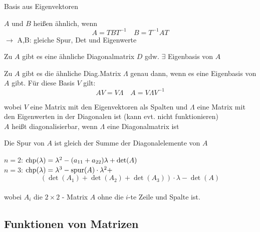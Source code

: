 \documentclass[a4paper,twocolumn]{article}
\begin{document}
	\begin{fdef}[Eigenbasis]
		Basis aus Eigenvektoren
	\end{fdef}

	\begin{feig}[A, B ähnlich]
		$A$ und $B$ heißen ähnlich, wenn 
			$$A = T B T^{-1}    \quad   B = T^{-1} A T$$
		$\rightarrow$ A,B: gleiche Spur, Det und Eigenwerte
	\end{feig}
	
		Zu $A$ gibt es eine ähnliche Diagonalmatrix $D$ gdw. $\exists$ Eigenbasis von $A$

	\begin{fsatz}
		Zu $A$ gibt es die ähnliche Diag.Matrix $\Lambda$ genau dann, wenn es eine Eigenbasis von $A$ gibt. Für diese Basis $V$ gilt:
		$$A V = V \Lambda \quad A = V \Lambda V^{-1}$$
		
		wobei $V$ eine Matrix mit den Eigenvektoren als Spalten und $\Lambda$ eine Matrix mit den Eigenwerten in der Diagonalen ist (kann evt. nicht funktionieren)\\[1mm]
		$A$ heißt diagonalisierbar, wenn $\Lambda$ eine Diagonalmatrix ist
	\end{fsatz}
	
		\begin{fdef}
			Die Spur von $A$ ist gleich der Summe der Diagonalelemente von $A$
		\end{fdef}
	
	\begin{fmerke}[Spezialfall A ($n = 2,3$)]
		$n=2$: $\text{chp}(\lambda) = \lambda^2 -(a_{11}+a_{22}) \lambda + \det(A)$\\
		$n=3$: $\text{chp}(\lambda) = \lambda^3 - \operatorname{spur}(A)\cdot\lambda^2 +$\\[-4mm]
				$$\left( \det(A_1) + \det(A_2) + \det(A_3) \right)\cdot\lambda - \det(A)$$\\[-5mm]
		wobei $A_i$ die $2 \times 2$ - Matrix $A$ ohne die $i$-te Zeile und Spalte ist.
	\end{fmerke}
		
	
	
	\subsection{Funktionen von Matrizen}
	
\end{document}
